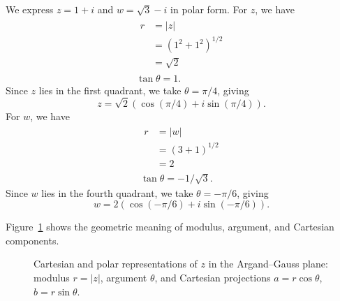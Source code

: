 \begin{example}
We express $z = 1+i$ and $w = \sqrt{3} - i$ in polar form.
For $z$, we have
\[
\begin{gathered}
\begin{aligned}
r &= |z| \\
&= (1^2+1^2)^{1/2} \\
&= \sqrt{2}
\end{aligned} \\
\tan \theta = 1.
\end{gathered}
\]
Since $z$ lies in the first quadrant, we take $\theta = \pi/4$, giving
\[
z = \sqrt{2} ( \cos(\pi/4) + i \sin(\pi/4) ).
\]
For $w$, we have
\[
\begin{gathered}
\begin{aligned}
r &= |w| \\
&= (3+1)^{1/2} \\
&= 2
\end{aligned} \\
\tan \theta = -1/\sqrt{3}.
\end{gathered}
\]
Since $w$ lies in the fourth quadrant, we take $\theta = -\pi/6$, giving
\[
w = 2 ( \cos(-\pi/6) + i \sin(-\pi/6) ).
\]

\end{example}

Figure~\ref{fig:ch2-polar-form} shows the geometric meaning of modulus, argument, and Cartesian components.

\begin{figure}[!htbp]
\centering
{}
\caption[Polar representation of a complex number]{Cartesian and polar
  representations of $z$ in the Argand--Gauss plane: modulus $r=|z|$,
  argument $\theta$, and Cartesian projections $a=r\cos\theta$, $b=r\sin\theta$.}
\label{fig:ch2-polar-form}
\end{figure}

